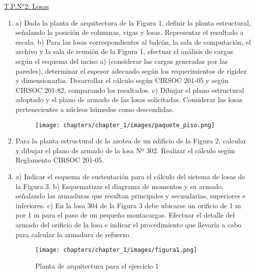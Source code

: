 \begin{center}
\underline{\Large{T.P.N°2: Losas}}
\end{center}

\begin{enumerate}
\item a) Dada la planta de arquitectura de la Figura 1, definir la planta estructural, señalando la posición de columnas, vigas y losas. Representar el resultado a escala. b) Para las losas correspondientes al balcón, la sala de computación, el archivo y la sala de reunión de la Figura 1, efectuar el análisis de cargas según el esquema del inciso a) (considerar las cargas generadas por las paredes), determinar el espesor adecuado según los requerimientos de rigidez y dimensionarlas. Desarrollar el cálculo según CIRSOC 201-05 y según CIRSOC 201-82, comparando los resultados. c) Dibujar el plano estructural adoptado y el plano de armado de las losas solicitadas. Considerar las losas pertenecientes a núcleos húmedos como descendidas.\\

\begin{figure}[H]
\begin{center}
     \texttt{[image: chapters/chapter\_1/images/paquete\_piso.png]}
\end{center}
\end{figure}

\item Para la planta estructural de la azotea de un edificio de la Figura 2, calcular y dibujar el plano de armado de la losa Nº 302. Realizar el cálculo según Reglamento CIRSOC 201-05.

\item a) Indicar el esquema de sustentación para el cálculo del sistema de losas de la Figura 3. b) Esquematizar el diagrama de momentos y su armado, señalando las armaduras que resultan principales y secundarias, superiores e inferiores. c) En la losa 304 de la Figura 3 debe ubicarse un orificio de 1 m por 1 m para el paso de un pequeño montacargas. Efectuar el detalle del armado del orificio de la losa e indicar el procedimiento que llevaría a cabo para calcular la armadura de refuerzo.

\begin{figure}[H]
\begin{center}
     \texttt{[image: chapters/chapter\_1/images/figura1.png]}
\end{center}
\caption{Planta de arquitectura para el ejercicio 1}
\end{figure}


\end{enumerate}
